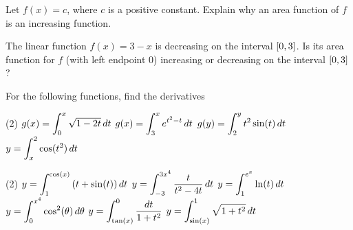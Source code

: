 \documentclass[mathNotesPreamble]{subfiles}
\begin{document}
\begin{ex*}
  Let $f(x)=c$, where $c$ is a positive constant. Explain why an area function of $f$ is an increasing function.
\end{ex*}

\begin{ex*}
  The linear function $f(x)=3-x$ is decreasing on the interval ${\left[0,3\right]}$. Is its area function for $f$ (with left endpoint 0) increasing or decreasing on the interval ${\left[0,3\right]}$?
\end{ex*}
\pagebreak

\noindent
{}

\begin{ex*}
  For the following functions, find the derivatives
\end{ex*}
\begin{tasks}[after-item-skip=\stretch{1}](2)
  \task $g(x)=\displaystyle\int_0^x \sqrt{1-2t}\,dt$
  \task $g(x)=\displaystyle\int_3^x e^{t^2-t}\,dt$
  \task $g(y)=\displaystyle\int_2^y t^2\sin(t)\,dt$
  \task $y=\displaystyle\int_x^2 \cos(t^2)\,dt$
\end{tasks}
\pagebreak

\begin{tasks}[after-item-skip=\stretch{1}, resume](2)
  \task $y=\displaystyle\int_1^{\cos(x)} {\left(t+\sin(t)\right)}\,dt$
  \task $y=\displaystyle\int_{-3}^{3x^4} \frac{t}{t^2-4t}\,dt$
  \task $y=\displaystyle\int_1^{e^x} \ln(t)\,dt$
  \task $y=\displaystyle\int_0^{x^4} \cos^2(\theta)\,d\theta$
  \task $y=\displaystyle\int_{\tan(x)}^0 \frac{dt}{1+t^2}$
  \task $y=\displaystyle\int_{\sin(x)}^1 \sqrt{1+t^2}\,dt$
\end{tasks}
\pagebreak

\noindent
{}
\end{document}
